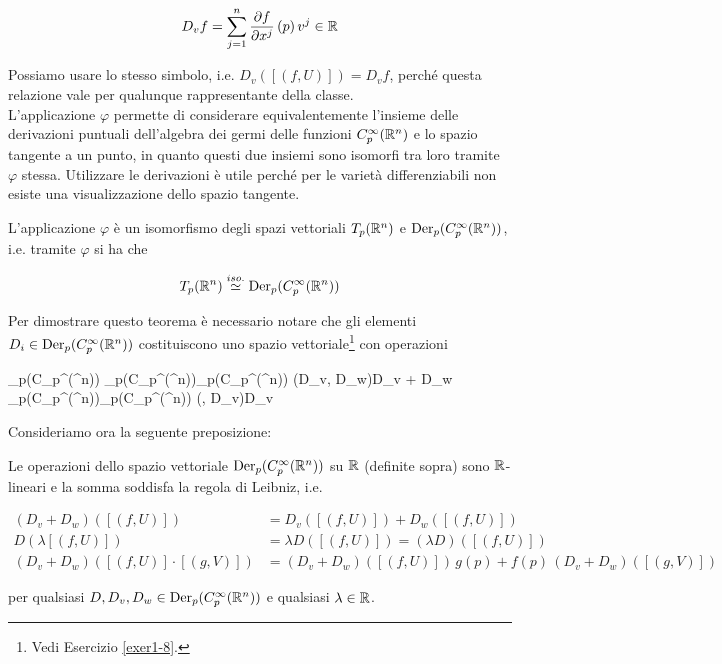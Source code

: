 \begin{align}
	D_{v} f = \sum_{j=1}^{n} \pdv{f}{x^{j}} \, (p) \, v^{j} \in \mathbb{R}
\end{align}

Possiamo usare lo stesso simbolo, i.e. $ D_{v} ([(f,U)]) = D_{v} f $, perché questa relazione vale per qualunque rappresentante della classe. \\
L'applicazione $ \varphi $ permette di considerare equivalentemente l'insieme delle derivazioni puntuali dell'algebra dei germi delle funzioni $ C_{p}^{\infty}(\mathbb{R}^{n}) $ e lo spazio tangente a un punto, in quanto questi due insiemi sono isomorfi tra loro tramite $ \varphi $ stessa. Utilizzare le derivazioni è utile perché per le varietà differenziabili non esiste una visualizzazione dello spazio tangente.

\begin{theorem}
	L'applicazione $ \varphi $ è un isomorfismo degli spazi vettoriali $ T_{p}(\mathbb{R}^{n}) $ e $ \operatorname{Der}_{p}(C_{p}^{\infty}(\mathbb{R}^{n})) $, i.e. tramite $ \varphi $ si ha che
	
	\begin{equation}
		T_{p}(\mathbb{R}^{n}) \stackrel{iso.}{\simeq} \operatorname{Der}_{p}(C_{p}^{\infty}(\mathbb{R}^{n}))
	\end{equation}
\end{theorem}

Per dimostrare questo teorema è necessario notare che gli elementi $ D_{i} \in \operatorname{Der}_{p}(C_{p}^{\infty}(\mathbb{R}^{n})) $ costituiscono uno spazio vettoriale\footnote{%
	Vedi Esercizio \ref{exer1-8}.%
} con operazioni

\map{+}
	{\der_{p}(C_{p}^{\infty}(\R^{n})) \times \der_{p}(C_{p}^{\infty}(\R^{n}))}{\der_{p}(C_{p}^{\infty}(\R^{n}))}
	{(D_{v}, D_{w})}{D_{v} + D_{w}}
\map{\cdot}
	{\R \times \der_{p}(C_{p}^{\infty}(\R^{n}))}{\der_{p}(C_{p}^{\infty}(\R^{n}))}
	{(\lambda, D_{v})}{\lambda D_{v}}

Consideriamo ora la seguente preposizione:

\begin{definition}
	Le operazioni dello spazio vettoriale $ \operatorname{Der}_{p}(C_{p}^{\infty}(\mathbb{R}^{n})) $ su $ \mathbb{R} $ (definite sopra) sono $ \mathbb{R} $-lineari e la somma soddisfa la regola di Leibniz, i.e.
	
	\begin{align}
		(D_{v} + D_{w}) ([(f,U)]) &= D_{v}([(f,U)]) + D_{w}([(f,U)]) \\
		D (\lambda [(f,U)]) &= \lambda D ([(f,U)]) = (\lambda D) ([(f,U)]) \\
		(D_{v} + D_{w}) ([(f,U)] \cdot [(g,V)]) &= (D_{v} + D_{w}) ([(f,U)]) \, g(p) + f(p) \, (D_{v} + D_{w}) ([(g,V)])
	\end{align}
	
	per qualsiasi $ D, D_{v}, D_{w} \in \operatorname{Der}_{p}(C_{p}^{\infty}(\mathbb{R}^{n})) $ e qualsiasi $ \lambda \in \mathbb{R} $.
\end{definition}

